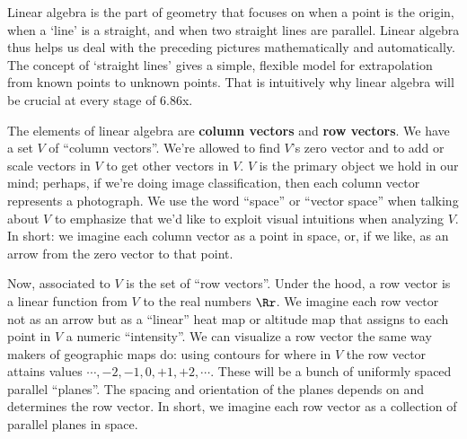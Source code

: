 

        Linear algebra is the part of geometry that focuses on when a point is
        the origin, when a `line' is a straight, and when two straight lines
        are parallel.
        Linear algebra thus helps us deal with the preceding pictures
        mathematically and automatically.  The concept of `straight lines'
        gives a simple, flexible model for extrapolation from known points to
        unknown points.  That is intuitively why linear algebra will be crucial
        at every stage of 6.86x.

        The elements of linear algebra are \textbf{column vectors} and
        \textbf{row vectors}.\bcirc {}
        We have a set $V$ of ``column vectors''.  We're allowed to find $V$'s
        zero vector and to add or scale vectors in $V$ to get other vectors in
        $V$.  $V$ is the primary object we hold in our mind; perhaps, if we're
        doing image classification, then each column vector represents a
        photograph.  We use the word ``space'' or ``vector space'' when talking
        about $V$ to emphasize that we'd like to exploit visual intuitions when
        analyzing $V$.  In short: we imagine each column vector as a point in
        space, or, if we like, as an arrow from the zero vector to that point.

        Now, associated to $V$ is the set of ``row vectors''.  Under the hood, a
        row vector is a linear function from $V$ to the real numbers $\Rr$.  We
        imagine each row vector not as an arrow but as a ``linear'' heat map or
        altitude map that assigns to each point in $V$ a numeric ``intensity''.
        We can visualize a row vector the same way makers of geographic maps
        do: using contours for where in $V$ the row vector attains values
        $\cdots,-2,-1,0,+1,+2,\cdots$.
        These will be a bunch of uniformly spaced parallel ``planes''.  The
        spacing and orientation of the planes depends on and determines the row
        vector.  In short, we imagine each row vector as a collection of
        parallel planes in space.

